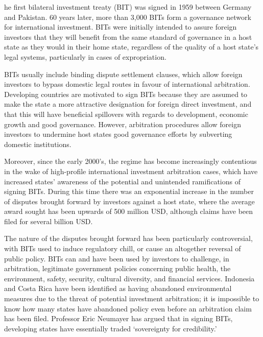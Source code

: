 \label{ch:bilateral-investment-treaties}

he first bilateral investment treaty (BIT) was signed in 1959 between
   Germany and Pakistan. 60 years later, more than 3,000 BITs form a
   governance network for international investment. BITs were initially
   intended to assure foreign investors that they will benefit from the
   same standard of governance in a host state as they would in their home
   state, regardless of the quality of a host state's legal systems,
   particularly in cases of expropriation.

   BITs usually include binding dispute settlement clauses, which allow
   foreign investors to bypass domestic legal routes in favour of
   international arbitration. Developing countries are motivated to sign
   BITs because they are assumed to make the state a more attractive
   designation for foreign direct investment, and that this will have
   beneficial spillovers with regards to development, economic growth and
   good governance. However, arbitration procedures allow foreign
   investors to undermine host states good governance efforts by
   subverting domestic institutions.

   Moreover, since the early 2000's, the regime has become increasingly
   contentious in the wake of high-profile international investment
   arbitration cases, which have increased states' awareness of the
   potential and unintended ramifications of signing BITs. During this
   time there was an exponential increase in the number of disputes
   brought forward by investors against a host state, where the average
   award sought has been upwards of 500 million USD, although claims have
   been filed for several billion USD.

   The nature of the disputes brought forward has been particularly
   controversial, with BITs used to induce regulatory chill, or cause an
   altogether reversal of public policy. BITs can and have been used by
   investors to challenge, in arbitration, legitimate government policies
   concerning public health, the environment, safety, security, cultural
   diversity, and financial services. Indonesia and Costa Rica have been
   identified as having abandoned environmental measures due to the threat
   of potential investment arbitration; it is impossible to know how many
   states have abandoned policy even before an arbitration claim has been
   filed. Professor Eric Neumayer has argued that in signing BITs,
   developing states have essentially traded `sovereignty for
   credibility.'

